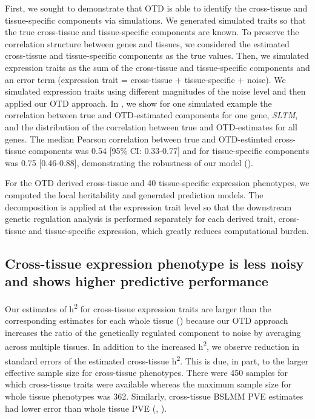 \documentclass[10pt,letterpaper]{article}
\begin{document}
First, we sought to demonstrate that OTD is able to identify the cross-tissue and tissue-specific components via simulations. We generated simulated traits so that the true cross-tissue and tissue-specific components are known. To preserve the correlation structure between genes and tissues, we considered the estimated cross-tissue and tissue-specific components as the true values. Then, we simulated expression traits as the sum of the cross-tissue and tissue-specific components and an error term (expression trait = cross-tissue + tissue-specific + noise). We simulated expression traits using different magnitudes of the noise level and then applied our OTD approach. 
In , we show for one simulated example the correlation between true and OTD-estimated components for one gene, \textit{SLTM}, and the distribution of the correlation between true and OTD-estimates for all genes. The median Pearson correlation between true and OTD-estimted cross-tissue components was 0.54 [95\% CI: 0.33-0.77] and for tissue-specific components was 0.75 [0.46-0.88], demonstrating the robustness of our model (). 

For the OTD derived cross-tissue and 40 tissue-specific expression phenotypes, we computed the local heritability and generated prediction models.
The decomposition is applied at the expression trait level so that the downstream genetic regulation analysis is performed separately for each derived trait, cross-tissue and tissue-specific expression, which greatly reduces computational burden. 

\subsection*{Cross-tissue expression phenotype is less noisy and shows higher predictive performance}%

Our estimates of h\textsuperscript{2} for cross-tissue expression traits are larger than the corresponding estimates for each whole tissue () because our OTD approach increases the ratio of the genetically regulated component to noise by averaging across multiple tissues. In addition to the increased h\textsuperscript{2}, we observe reduction in standard errors of the estimated cross-tissue h\textsuperscript{2}. This is due, in part, to the larger effective sample size for cross-tissue phenotypes. There were 450 samples for which cross-tissue traits were available whereas the maximum sample size for whole tissue phenotypes was 362. Similarly, cross-tissue BSLMM PVE estimates had lower error than whole tissue PVE (, ). 
\end{document}
